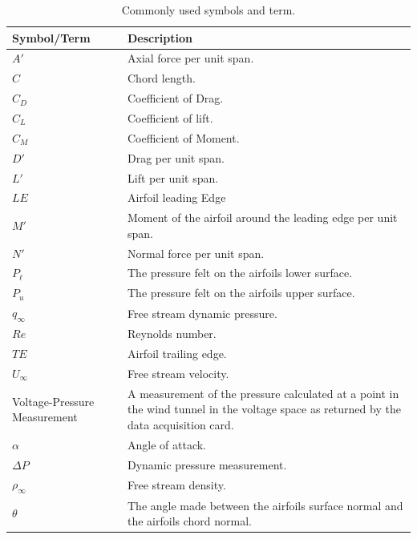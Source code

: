 \documentclass[runningheads]{llncs}
\begin{document}
\begin{table}[h]
    \centering
    \begin{tabular}{p{4.5cm}p{11cm}}
        \toprule
        Symbol/Term & Description \\
        \midrule
        $A'$ & Axial force per unit span. \\
        $C$ & Chord length. \\
        $C_D$ & Coefficient of Drag. \\
        $C_L$ & Coefficient of lift. \\
        $C_M$ & Coefficient of Moment. \\
        $D'$ & Drag per unit span. \\
        $L'$ & Lift per unit span.\\
        $LE$ & Airfoil leading Edge \\
        $M'$ & Moment of the airfoil around the leading edge per unit span. \\
        $N'$ & Normal force per unit span. \\
        $P_\ell$ & The pressure felt on the airfoils lower surface. \\
        $P_u$ & The pressure felt on the airfoils upper surface. \\
        $q_\infty$ & Free stream dynamic pressure. \\
        $Re$ & Reynolds number. \\
        $TE$ & Airfoil trailing edge. \\
        $U_\infty$ & Free stream velocity. \\
        Voltage-Pressure Measurement & A measurement of the pressure calculated at a point in the wind tunnel in the voltage space as returned by the data acquisition card. \\
        $\alpha$ & Angle of attack. \\
        $\Delta P$ & Dynamic pressure measurement. \\
        $\rho_\infty$ & Free stream density. \\
        $\theta$ & The angle made between the airfoils surface normal and the airfoils chord normal. \\
        \bottomrule
    \end{tabular}
    \caption{Commonly used symbols and term.}
    \label{tab:nomenclature}
\end{table}


\end{document}
